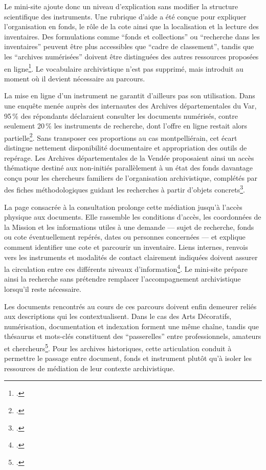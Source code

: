 Le mini-site ajoute donc un niveau d'explication sans modifier la structure scientifique des instruments. Une rubrique d'aide a été conçue pour expliquer l'organisation en fonds, le rôle de la cote ainsi que la localisation et la lecture des inventaires. Des formulations comme \enquote{fonds et collections} ou \enquote{recherche dans les inventaires} peuvent être plus accessibles que \enquote{cadre de classement}, tandis que les \enquote{archives numérisées} doivent être distinguées des autres ressources proposées en ligne\footcite[p.~28]{Homer2021}. Le vocabulaire archivistique n'est pas supprimé, mais introduit au moment où il devient nécessaire au parcours.

La mise en ligne d'un instrument ne garantit d'ailleurs pas son utilisation. Dans une enquête menée auprès des internautes des Archives départementales du Var, 95\,\% des répondants déclaraient consulter les documents numérisés, contre seulement 20\,\% les instruments de recherche, dont l'offre en ligne restait alors partielle\footcite[p.~154]{BugatDroguetJegouzo2007}. Sans transposer ces proportions au cas montpelliérain, cet écart distingue nettement disponibilité documentaire et appropriation des outils de repérage. Les Archives départementales de la Vendée proposaient ainsi un accès thématique destiné aux non-initiés parallèlement à un état des fonds davantage conçu pour les chercheurs familiers de l'organisation archivistique, complétés par des fiches méthodologiques guidant les recherches à partir d'objets concrets\footcite[p.~141]{Roy2012}.

La page consacrée à la consultation prolonge cette médiation jusqu'à l'accès physique aux documents. Elle rassemble les conditions d'accès, les coordonnées de la Mission et les informations utiles à une demande --- sujet de recherche, fonds ou cote éventuellement repérés, dates ou personnes concernées --- et explique comment identifier une cote et parcourir un inventaire. Liens internes, renvois vers les instruments et modalités de contact clairement indiquées doivent assurer la circulation entre ces différents niveaux d'information\footcite[p.~96]{FerradouFine2011}. Le mini-site prépare ainsi la recherche sans prétendre remplacer l'accompagnement archivistique lorsqu'il reste nécessaire.

Les documents rencontrés au cours de ces parcours doivent enfin demeurer reliés aux descriptions qui les contextualisent. Dans le cas des Arts Décoratifs, numérisation, documentation et indexation forment une même chaîne, tandis que thésaurus et mots-clés constituent des \enquote{passerelles} entre professionnels, amateurs et chercheurs\footcite[pp.~222--223]{Collin2017}. Pour les archives historiques, cette articulation conduit à permettre le passage entre document, fonds et instrument plutôt qu'à isoler les ressources de médiation de leur contexte archivistique.

